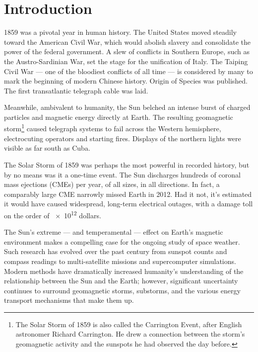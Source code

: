


\chapter{Introduction}
  \label{ch_intro}



1859 was a pivotal year in human history. The United States moved steadily toward the American Civil War, which would abolish slavery and consolidate the power of the federal government. A slew of conflicts in Southern Europe, such as the Austro-Sardinian War, set the stage for the unification of Italy. The Taiping Civil War --- one of the bloodiest conflicts of all time --- is considered by many to mark the beginning of modern Chinese history. Origin of Species was published. The first transatlantic telegraph cable was laid.

Meanwhile, ambivalent to humanity, the Sun belched an intense burst of charged particles and magnetic energy directly at Earth. The resulting geomagnetic storm\footnote{The Solar Storm of 1859 is also called the Carrington Event, after English astronomer Richard Carrington. He drew a connection between the storm's geomagnetic activity and the sunspots he had observed the day before.} caused telegraph systems to fail across the Western hemisphere, electrocuting operators and starting fires\cite{green_2006,tsurutani_2003}. Displays of the northern lights were visible as far south as Cuba. 

The Solar Storm of 1859 was perhaps the most powerful in recorded history, but by no means was it a one-time event. The Sun discharges hundreds of coronal mass ejections (CMEs) per year, of all sizes, in all directions. In fact, a comparably large CME narrowly missed Earth in 2012\cite{nasa_2012}. Had it not, it's estimated it would have caused widespread, long-term electrical outages, with a damage toll on the order of \num{e12} dollars\cite{lloyds_2013}. 

The Sun's extreme --- and temperamental --- effect on Earth's magnetic environment makes a compelling case for the ongoing study of space weather. Such research has evolved over the past century from sunspot counts and compass readings to multi-satellite missions and supercomputer simulations. Modern methods have dramatically increased humanity's understanding of the relationship between the Sun and the Earth; however, significant uncertainty continues to surround geomagnetic storms, substorms, and the various energy transport mechanisms that make them up. 

